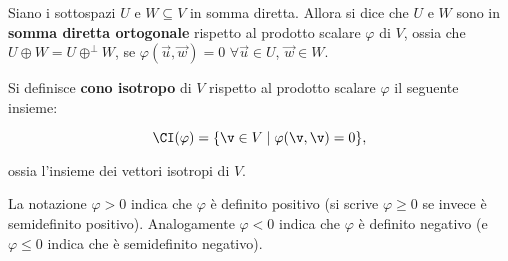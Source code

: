 \documentclass[11pt]{article}
\begin{document}
	\begin{definition}
		Siano i sottospazi $U$ e $W \subseteq V$ in somma diretta. Allora si dice che $U$ e $W$ sono in \textbf{somma
		diretta ortogonale} rispetto al prodotto scalare $\varphi$ di $V$, ossia che $U \oplus W = U \oplus^\perp W$, se $\varphi(\vec u, \vec w) = 0$ $\forall \vec u \in U$, $\vec w \in W$.
	\end{definition}

	\begin{definition}
		Si definisce \textbf{cono isotropo} di $V$ rispetto al prodotto scalare $\varphi$ il seguente insieme:
		
		\[ \CI(\varphi) = \{ \v \in V \mid \varphi(\v, \v) = 0 \}, \]
		
		\vskip 0.05in
		
		ossia l'insieme dei vettori isotropi di $V$.
	\end{definition}

	\begin{note}
		La notazione $\varphi > 0$ indica che $\varphi$ è definito positivo (si scrive $\varphi \geq 0$ se invece è semidefinito
		positivo).
		Analogamente $\varphi < 0$ indica che $\varphi$ è definito negativo (e $\varphi \leq 0$ indica che è semidefinito negativo).
	\end{note}
\end{document}
